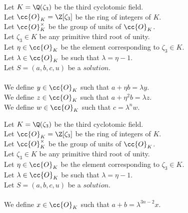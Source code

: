 \begin{definition}[$y,z,w$]
  \label{def:Solution_x_y_z_w}
  \leanok
  Let $K = \Q(\zeta_3)$ be the third cyclotomic field. \\
  Let $\cc{O}_K = \Z[\zeta_3]$ be the ring of integers of $K$. \\
  Let $\cc{O}^\times_K$ be the group of units of $\cc{O}_K$. \\
  Let $\zeta_3 \in K$ be any primitive third root of unity. \\
  Let $\eta \in \cc{O}_K$ be the element corresponding to $\zeta_3 \in K$. \\
  Let $\lambda \in \cc{O}_K$ be such that $\lambda = \eta -1$. \\
  Let $S=(a, b, c, u)$ be a $solution$.\\\\
  We define $y \in \cc{O}_K$ such that $a + \eta  b = \lambda  y$.\\
  We define $z \in \cc{O}_K$ such that $a + \eta^2  b = \lambda  z$.\\
  We define $w \in \cc{O}_K$ such that $c = \lambda^n  w$.
\end{definition}

\begin{definition}[$x$]
  \label{def:Solution_x}
  \leanok
  Let $K = \Q(\zeta_3)$ be the third cyclotomic field. \\
  Let $\cc{O}_K = \Z[\zeta_3]$ be the ring of integers of $K$. \\
  Let $\cc{O}^\times_K$ be the group of units of $\cc{O}_K$. \\
  Let $\zeta_3 \in K$ be any primitive third root of unity. \\
  Let $\eta \in \cc{O}_K$ be the element corresponding to $\zeta_3 \in K$. \\
  Let $\lambda \in \cc{O}_K$ be such that $\lambda = \eta -1$. \\
  Let $S=(a, b, c, u)$ be a $solution$.\\\\
  We define $x \in \cc{O}_K$ such that $a + b = \lambda^{3n-2}  x$.
\end{definition}


